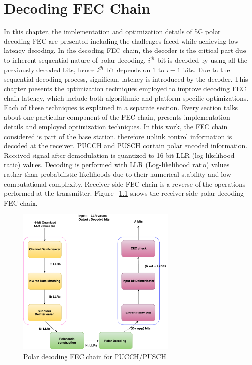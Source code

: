 \chapter{Decoding FEC Chain} \label{chap:DecodingChain}
In this chapter, the implementation and optimization details of 5G polar decoding FEC are presented including the challenges faced while achieving low latency decoding. In the decoding FEC chain, the decoder is the critical part due to inherent sequential nature of polar decoding. $i^{th}$ bit is decoded by using all the previously decoded bits, hence $i^{th}$ bit depends on $1$ to $i-1$ bits. Due to the sequential decoding process, significant latency is introduced by the decoder. This chapter presents the optimization techniques employed to improve decoding FEC chain latency, which include both algorithmic and platform-specific optimizations. Each of these techniques is explained in a separate section. Every section talks about one particular component of the FEC chain, presents implementation details and employed optimization techniques. In this work, the FEC chain considered is part of the base station, therefore uplink control information is decoded at the receiver. PUCCH and PUSCH contain polar encoded information. Received signal after demodulation is quantized to 16-bit LLR (log likelihood ratio) values. Decoding is performed with LLR (Log-likelihood ratio) values rather than probabilistic likelihoods due to their numerical stability and low computational complexity. Receiver side FEC chain is a reverse of the operations performed at the transmitter. Figure ~\ref{fig:5grx_fec_chain} shows the receiver side polar decoding FEC chain.

\begin{figure}[]
	\centering
	\includegraphics[width=0.7\textwidth]{./figures/receiverFECChain_crc.pdf}
	\caption{Polar decoding FEC chain for PUCCH/PUSCH}
	\label{fig:5grx_fec_chain}
\end{figure}

